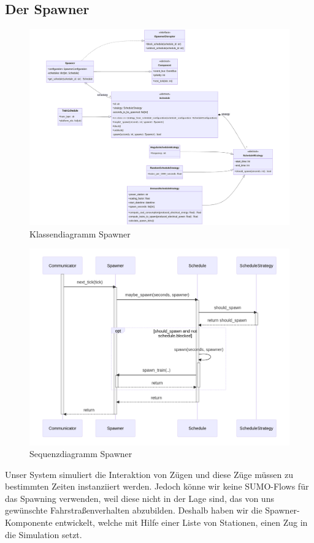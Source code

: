 \subsection{Der Spawner}

\begin{figure}[!hb]
	\centering
	\includegraphics[width=0.75\linewidth]{images/diagrams/spawner-class.png}
	\caption{Klassendiagramm Spawner}
	\label{fig:spawner-class}
\end{figure}

\begin{figure}[!hb]
	\centering
	\includegraphics[width=0.75\linewidth]{images/diagrams/spawner-seq.png}
	\caption{Sequenzdiagramm Spawner}
	\label{fig:spawner-seq}
\end{figure}

Unser System simuliert die Interaktion von Zügen und diese Züge müssen zu bestimmten Zeiten instanziiert werden. Jedoch könne wir keine SUMO-Flows für das Spawning verwenden, weil diese nicht in der Lage sind, das von uns gewünschte Fahrstraßenverhalten abzubilden. Deshalb haben wir die Spawner-Komponente entwickelt, welche mit Hilfe einer Liste von Stationen, einen Zug in die Simulation setzt.

